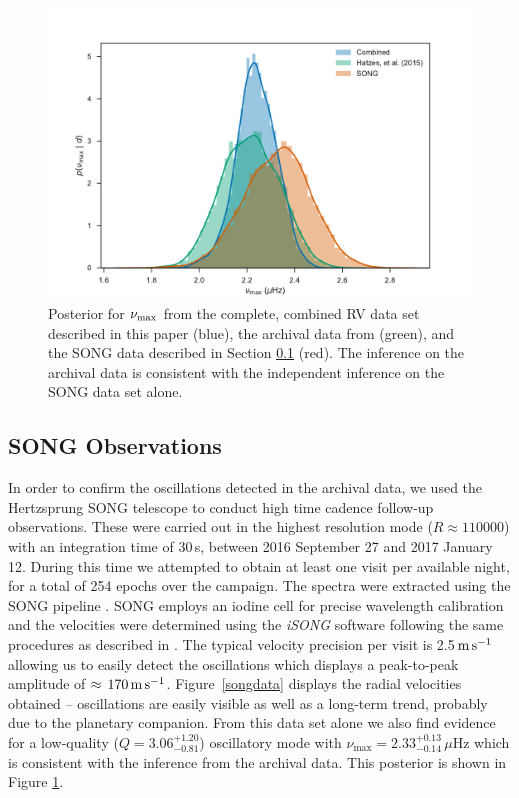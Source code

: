 \documentclass[modern]{aastex61}
\newcommand{\numax}{\mbox{$\nu_{\rm max}$}\xspace}
\newcommand{\twosidedrange}[3]{\ensuremath{#1^{+#2}_{-#3}}}
\newcommand{\SONGQRange}{\twosidedrange{3.06}{1.20}{0.81}}
\newcommand{\SONGNuMaxRange}{\twosidedrange{2.33}{0.13}{0.14}}
\begin{document}
\begin{figure}
  \includegraphics[width=\columnwidth]{../plots/numax}
  \caption{Posterior for \numax{} from the complete, combined RV data set described in this paper (blue), the archival data from \citet{Hatzes2015} (green), and the SONG data described in Section \ref{sec:SONG-observations} (red).  The inference on the archival data is consistent with the independent inference on the SONG data set alone.}
  \label{fig:numax-datasets}
\end{figure}

\subsection{SONG Observations}    %
\label{sec:SONG-observations} In order to confirm the oscillations detected in
the archival data, we used the Hertzsprung SONG telescope
\citep{2017ApJ...836..142G} to conduct high time cadence follow-up observations.
These were carried out in the highest resolution mode ($R\approx110000$) with an
integration time of 30\,s, between 2016 September 27 and 2017 January 12. During
this time we attempted to obtain at least one visit per available night, for a
total of 254 epochs over the campaign. The spectra were extracted using the SONG
pipeline \citep[see][]{2017ApJ...836..142G}. SONG employs an iodine cell for
precise wavelength calibration and the velocities were determined using the
\textit{iSONG} software following the same procedures as described in
\cite{2017ApJ...836..142G}. The typical velocity precision per visit is
2.5$\,\rm m\,s^{-1}$ allowing us to easily detect the oscillations which
displays a peak-to-peak amplitude of $\approx \, 170 \, \rm m \, s^{-1}$.
Figure~\ref{songdata} displays the radial velocities obtained -- oscillations
are easily visible as well as a long-term trend, probably due to the planetary
companion.  From this data set alone we also find evidence for a low-quality ($Q
= \SONGQRange{}$) oscillatory mode with $\nu_\mathrm{max} = \SONGNuMaxRange{} \,
\mu\mathrm{Hz}$ which is consistent with the inference from the archival data.
This posterior is shown in Figure \ref{fig:numax-datasets}.
\end{document}
